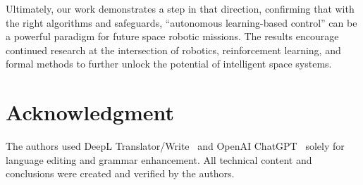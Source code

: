 \documentclass{ieeeaccess}
\begin{document}
Ultimately, our work demonstrates a step in that direction, confirming that with the right algorithms
and safeguards, “autonomous learning-based control” can be a powerful paradigm for future space
robotic missions. The results encourage continued research at the intersection of robotics,
reinforcement learning, and formal methods to further unlock the potential of intelligent space
systems.

\section*{Acknowledgment}
The authors used DeepL Translator/Write~\cite{deeplTr,deeplWr} and OpenAI ChatGPT~\cite{openai_chatgpt} solely for language editing and grammar enhancement. 
All technical content and conclusions were created and verified by the authors.
\end{document}

